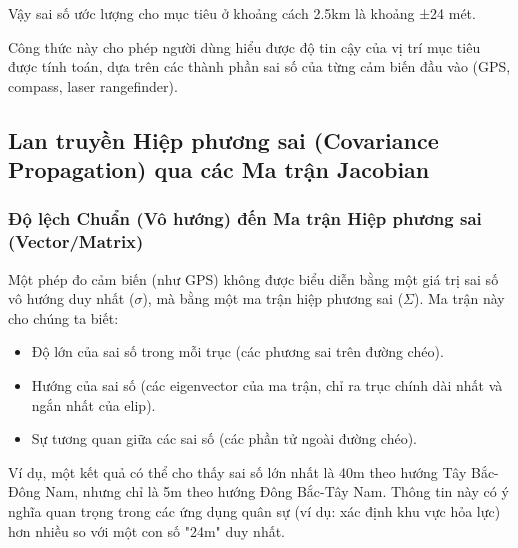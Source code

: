 Vậy sai số ước lượng cho mục tiêu ở khoảng cách 2.5km là khoảng ±24 mét.

Công thức này cho phép người dùng hiểu được độ tin cậy của vị trí mục tiêu được tính toán, dựa trên các thành phần sai số của từng cảm biến đầu vào (GPS, compass, laser rangefinder).
\subsection{Lan truyền Hiệp phương sai (Covariance Propagation) qua các Ma trận Jacobian}
\subsubsection{Độ lệch Chuẩn (Vô hướng) đến Ma trận Hiệp phương sai (Vector/Matrix)}
Một phép đo cảm biến (như GPS) không được biểu diễn bằng một giá trị sai số vô hướng duy nhất ($\sigma$), mà bằng một ma trận hiệp phương sai ($\Sigma$).
Ma trận này cho chúng ta biết:
\begin{itemize}
    \item Độ lớn của sai số trong mỗi trục (các phương sai trên đường chéo).
    \item Hướng của sai số (các eigenvector của ma trận, chỉ ra trục chính dài nhất và ngắn nhất của elip).
    \item Sự tương quan giữa các sai số (các phần tử ngoài đường chéo).

\end{itemize}
Ví dụ, một kết quả có thể cho thấy sai số lớn nhất là 40m theo hướng Tây Bắc-Đông Nam, nhưng chỉ là 5m theo hướng Đông Bắc-Tây Nam. Thông tin này có ý nghĩa quan trọng trong các ứng dụng quân sự (ví dụ: xác định khu vực hỏa lực) hơn nhiều so với một con số "24m" duy nhất.

